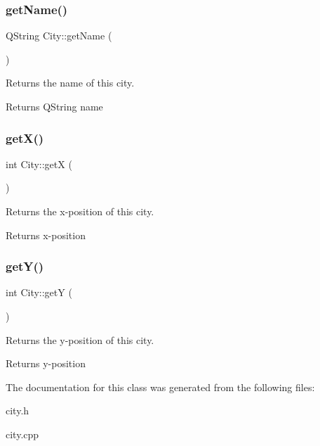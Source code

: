 \subsubsection{\texorpdfstring{get\+Name()}{getName()}}
{\footnotesize\ttfamily Q\+String City\+::get\+Name (\begin{DoxyParamCaption}{ }\end{DoxyParamCaption})}



Returns the name of this city. 

\begin{DoxyReturn}{Returns}
Q\+String name 
\end{DoxyReturn}
\mbox{\label{class_city_a31a58c2f36a488519ce6bb8373e6a329}} 
\subsubsection{\texorpdfstring{get\+X()}{getX()}}
{\footnotesize\ttfamily int City\+::getX (\begin{DoxyParamCaption}{ }\end{DoxyParamCaption})}



Returns the x-\/position of this city. 

\begin{DoxyReturn}{Returns}
x-\/position 
\end{DoxyReturn}
\mbox{\label{class_city_ada68b2e07e01a526b68011c3a638ee96}} 
\subsubsection{\texorpdfstring{get\+Y()}{getY()}}
{\footnotesize\ttfamily int City\+::getY (\begin{DoxyParamCaption}{ }\end{DoxyParamCaption})}



Returns the y-\/position of this city. 

\begin{DoxyReturn}{Returns}
y-\/position 
\end{DoxyReturn}


The documentation for this class was generated from the following files\+:\begin{DoxyCompactItemize}
\item 
city.\+h\item 
city.\+cpp\end{DoxyCompactItemize}
